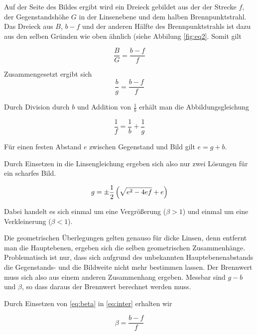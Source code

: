 \documentclass[a4paper,german,12pt,smallheadings]{scrartcl}
\begin{document}
Auf der Seite des Bildes ergibt wird ein Dreieck gebildet aus der der Strecke
$f$, der Gegenstandshöhe $G$ in der Linsenebene und dem halben
Brennpunktstrahl. Das Dreieck aus $B$, $b-f$ und der anderen Hälfte des
Brennpunktstrahls ist dazu aus den selben Gründen wie oben ähnlich (siehe
Abbilung \ref{fig:eq2}. Somit gilt

\begin{equation}
  \frac{B}{G} = \frac{b-f}{f}
\end{equation}

Zusammengesetzt ergibt sich
\begin{equation}
  \frac{b}{g} = \frac{b-f}{f}
  \label{eq:inter}
\end{equation}

Durch Division durch $b$ und Addition von $\frac{1}{b}$ erhält man die
Abbildungsgleichung

\begin{equation}
  \frac{1}{f} = \frac{1}{b} + \frac{1}{g}
\end{equation}


Für einen festen Abstand $e$ zwischen Gegenstand und Bild gilt $e = g+b$.

Durch Einsetzen in die Linsengleichung ergeben sich also nur zwei Lösungen für
ein scharfes Bild. %

\begin{equation}
  g = \pm \frac{1}{2} \del{\sqrt{e^2 - 4ef} + e}
\end{equation}

Dabei handelt es sich einmal um eine Vergrößerung ($\beta > 1$) und einmal um
eine Verkleinerung ($\beta < 1$). %

Die geometrischen Überlegungen gelten genauso für dicke Linsen, denn entfernt
man die Hauptebenen, ergeben sich die selben geometrischen Zusammenhänge.
Problematisch ist nur, dass sich aufgrund des unbekannten Hauptebenenabstands
die Gegenstands- und die Bildweite nicht mehr bestimmen lassen. Der Brennwert
muss sich also aus einem anderen Zusammenhang ergeben. Messbar sind $g-b$ und
$\beta$, so dass daraus der Brennwert berechnet werden muss.

Durch Einsetzen von \ref{eq:beta} in \ref{eq:inter} erhalten wir

\begin{equation}
  \beta = \frac{b-f}{f}
\end{equation}
\end{document}

